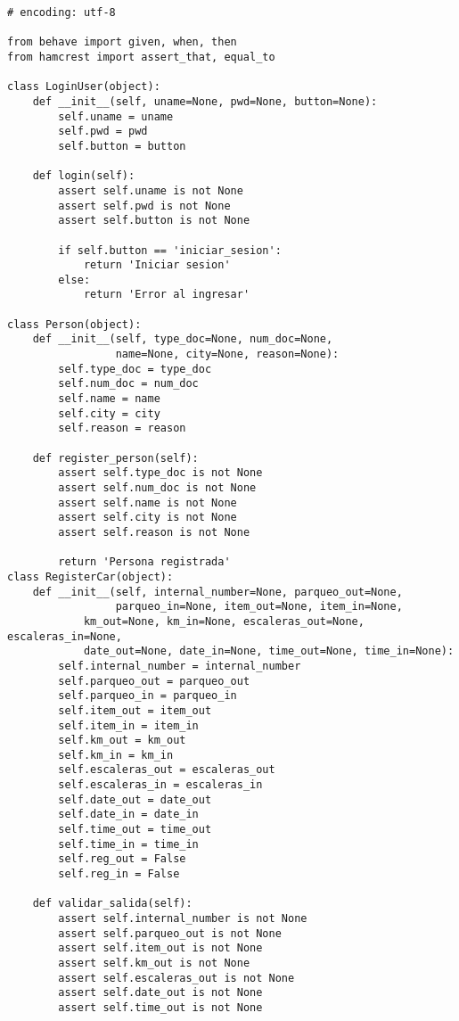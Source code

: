 {\scriptsize
  \begin{verbatim}
# encoding: utf-8

from behave import given, when, then
from hamcrest import assert_that, equal_to

class LoginUser(object):
    def __init__(self, uname=None, pwd=None, button=None):
        self.uname = uname
        self.pwd = pwd
        self.button = button

    def login(self):
        assert self.uname is not None
        assert self.pwd is not None
        assert self.button is not None

        if self.button == 'iniciar_sesion':
            return 'Iniciar sesion'
        else:
            return 'Error al ingresar'

class Person(object):
    def __init__(self, type_doc=None, num_doc=None,
                 name=None, city=None, reason=None):
        self.type_doc = type_doc
        self.num_doc = num_doc
        self.name = name
        self.city = city
        self.reason = reason

    def register_person(self):
        assert self.type_doc is not None
        assert self.num_doc is not None
        assert self.name is not None
        assert self.city is not None
        assert self.reason is not None

        return 'Persona registrada'
class RegisterCar(object):
    def __init__(self, internal_number=None, parqueo_out=None,
                 parqueo_in=None, item_out=None, item_in=None,
            km_out=None, km_in=None, escaleras_out=None, escaleras_in=None,
            date_out=None, date_in=None, time_out=None, time_in=None):
        self.internal_number = internal_number
        self.parqueo_out = parqueo_out
        self.parqueo_in = parqueo_in
        self.item_out = item_out
        self.item_in = item_in
        self.km_out = km_out
        self.km_in = km_in
        self.escaleras_out = escaleras_out
        self.escaleras_in = escaleras_in
        self.date_out = date_out
        self.date_in = date_in
        self.time_out = time_out
        self.time_in = time_in
        self.reg_out = False
        self.reg_in = False

    def validar_salida(self):
        assert self.internal_number is not None
        assert self.parqueo_out is not None
        assert self.item_out is not None
        assert self.km_out is not None
        assert self.escaleras_out is not None
        assert self.date_out is not None
        assert self.time_out is not None


\end{verbatim}}
